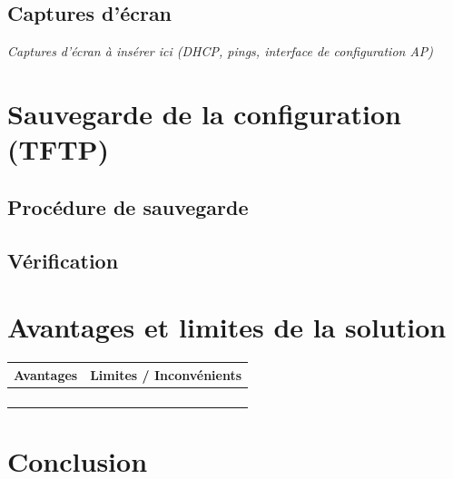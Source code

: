 \documentclass[a4paper,12pt]{article}
\begin{document}
\subsection{Captures d'écran}


\begin{infobox}
  \textit{Captures d'écran à insérer ici (DHCP, pings, interface de configuration AP)}
\end{infobox}

\section{Sauvegarde de la configuration (TFTP)}

\subsection{Procédure de sauvegarde}


\begin{tcolorbox}[colback=black!90, coltext=green!70!white, fontupper=\ttfamily\small,
  title={\color{white}\small Sauvegarde vers TFTP}, colbacktitle=primary]
\end{tcolorbox}

\subsection{Vérification}


\section{Avantages et limites de la solution}

\begin{tabularx}{\textwidth}{X X}
  \toprule
  \textbf{Avantages} & \textbf{Limites / Inconvénients} \\
  \midrule
  & \\
  & \\
  & \\
  & \\
  \bottomrule
\end{tabularx}

\section*{Conclusion}

\end{document}
